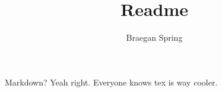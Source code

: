 \documentclass{article}
\title{Readme}
\author{Braegan Spring}
\begin{document}
\maketitle

Markdown? Yeah right. Everyone knows tex is way cooler. 
\end{document}
